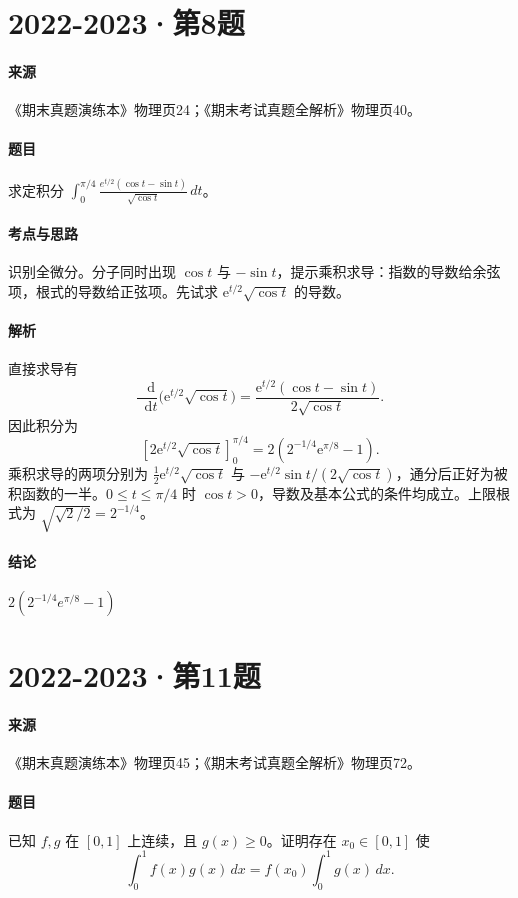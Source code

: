 \documentclass[UTF8,fontset=fandol,12pt,oneside,openany]{ctexrep}
\newcommand{\dd}{\mathop{}\!\mathrm d}
\newcommand{\ee}{\mathrm e}
\theoremstyle{definition}
\begin{document}
\par\addvspace{18pt}\noindent\begin{minipage}{\linewidth}
\section{2022-2023·第8题}
\label{exam:11:q8}
\paragraph{来源} 《期末真题演练本》物理页24；《期末考试真题全解析》物理页40。
\paragraph{题目}
求定积分 $\int_0^{\pi/4}\frac{e^{t/2}(\cos t-\sin t)}{\sqrt{\cos t}}\,dt$。
\end{minipage}\par
\paragraph{考点与思路}
识别全微分。分子同时出现 $\cos t$ 与 $-\sin t$，提示乘积求导：指数的导数给余弦项，根式的导数给正弦项。先试求 $\ee^{t/2}\sqrt{\cos t}$ 的导数。
\paragraph{解析}
直接求导有
\[
 \frac{\dd}{\dd t}\bigl(\ee^{t/2}\sqrt{\cos t}\bigr)
 =\frac{\ee^{t/2}(\cos t-\sin t)}{2\sqrt{\cos t}}.
\]
因此积分为
\[
 [2\ee^{t/2}\sqrt{\cos t}]_0^{\pi/4}
 =2(2^{-1/4}\ee^{\pi/8}-1).
\]
乘积求导的两项分别为 $\frac12\ee^{t/2}\sqrt{\cos t}$ 与 $-\ee^{t/2}\sin t/(2\sqrt{\cos t})$，通分后正好为被积函数的一半。$0\le t\le\pi/4$ 时 $\cos t>0$，导数及基本公式的条件均成立。上限根式为 $\sqrt{\sqrt2/2}=2^{-1/4}$。
\paragraph{结论}
$2\left(2^{-1/4}e^{\pi/8}-1\right)$

\par\addvspace{18pt}\noindent\begin{minipage}{\linewidth}
\section{2022-2023·第11题}
\label{exam:11:q9}
\paragraph{来源} 《期末真题演练本》物理页45；《期末考试真题全解析》物理页72。
\paragraph{题目}
已知 $f,g$ 在 $[0,1]$ 上连续，且 $g(x)\ge0$。证明存在 $x_0\in[0,1]$ 使
\[\int_0^1 f(x)g(x)\,dx=f(x_0)\int_0^1g(x)\,dx.\]
\end{minipage}\par
\end{document}
